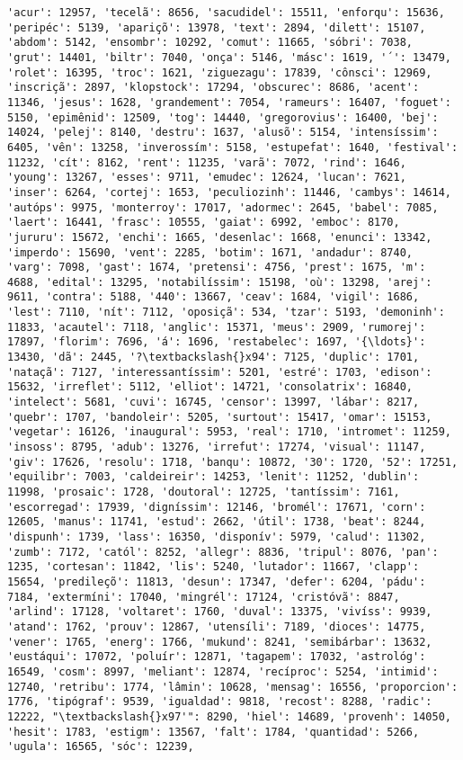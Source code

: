 \documentclass[11pt]{article}
\begin{document}
\begin{Verbatim}[commandchars=\\\{\}]
'acur': 12957, 'tecelã': 8656, 'sacudidel': 15511, 'enforqu': 15636, 'peripéc': 5139, 'apariçõ': 13978, 'text': 2894, 'dilett': 15107, 'abdom': 5142, 'ensombr': 10292, 'comut': 11665, 'sóbri': 7038, 'grut': 14401, 'biltr': 7040, 'onça': 5146, 'másc': 1619, '´': 13479, 'rolet': 16395, 'troc': 1621, 'ziguezagu': 17839, 'cônsci': 12969, 'inscriçã': 2897, 'klopstock': 17294, 'obscurec': 8686, 'acent': 11346, 'jesus': 1628, 'grandement': 7054, 'rameurs': 16407, 'foguet': 5150, 'epimênid': 12509, 'tog': 14440, 'gregorovius': 16400, 'bej': 14024, 'pelej': 8140, 'destru': 1637, 'alusõ': 5154, 'intensíssim': 6405, 'vên': 13258, 'inverossím': 5158, 'estupefat': 1640, 'festival': 11232, 'cít': 8162, 'rent': 11235, 'varã': 7072, 'rind': 1646, 'young': 13267, 'esses': 9711, 'emudec': 12624, 'lucan': 7621, 'inser': 6264, 'cortej': 1653, 'peculiozinh': 11446, 'cambys': 14614, 'autóps': 9975, 'monterroy': 17017, 'adormec': 2645, 'babel': 7085, 'laert': 16441, 'frasc': 10555, 'gaiat': 6992, 'emboc': 8170, 'jururu': 15672, 'enchi': 1665, 'desenlac': 1668, 'enunci': 13342, 'imperdo': 15690, 'vent': 2285, 'botim': 1671, 'andadur': 8740, 'varg': 7098, 'gast': 1674, 'pretensi': 4756, 'prest': 1675, 'm': 4688, 'edital': 13295, 'notabilíssim': 15198, 'où': 13298, 'arej': 9611, 'contra': 5188, '440': 13667, 'ceav': 1684, 'vigil': 1686, 'lest': 7110, 'nít': 7112, 'oposiçã': 534, 'tzar': 5193, 'demoninh': 11833, 'acautel': 7118, 'anglic': 15371, 'meus': 2909, 'rumorej': 17897, 'florim': 7696, 'á': 1696, 'restabelec': 1697, '{\ldots}': 13430, 'dã': 2445, '?\textbackslash{}x94': 7125, 'duplic': 1701, 'nataçã': 7127, 'interessantíssim': 5201, 'estré': 1703, 'edison': 15632, 'irreflet': 5112, 'elliot': 14721, 'consolatrix': 16840, 'intelect': 5681, 'cuvi': 16745, 'censor': 13997, 'lábar': 8217, 'quebr': 1707, 'bandoleir': 5205, 'surtout': 15417, 'omar': 15153, 'vegetar': 16126, 'inaugural': 5953, 'real': 1710, 'intromet': 11259, 'insoss': 8795, 'adub': 13276, 'irrefut': 17274, 'visual': 11147, 'giv': 17626, 'resolu': 1718, 'banqu': 10872, '30': 1720, '52': 17251, 'equilibr': 7003, 'caldeireir': 14253, 'lenit': 11252, 'dublin': 11998, 'prosaic': 1728, 'doutoral': 12725, 'tantíssim': 7161, 'escorregad': 17939, 'digníssim': 12146, 'bromél': 17671, 'corn': 12605, 'manus': 11741, 'estud': 2662, 'útil': 1738, 'beat': 8244, 'dispunh': 1739, 'lass': 16350, 'disponív': 5979, 'calud': 11302, 'zumb': 7172, 'catól': 8252, 'allegr': 8836, 'tripul': 8076, 'pan': 1235, 'cortesan': 11842, 'lis': 5240, 'lutador': 11667, 'clapp': 15654, 'predileçõ': 11813, 'desun': 17347, 'defer': 6204, 'pádu': 7184, 'extermíni': 17040, 'mingrél': 17124, 'cristóvã': 8847, 'arlind': 17128, 'voltaret': 1760, 'duval': 13375, 'vivíss': 9939, 'atand': 1762, 'prouv': 12867, 'utensíli': 7189, 'dioces': 14775, 'vener': 1765, 'energ': 1766, 'mukund': 8241, 'semibárbar': 13632, 'eustáqui': 17072, 'poluír': 12871, 'tagapem': 17032, 'astrológ': 16549, 'cosm': 8997, 'meliant': 12874, 'recíproc': 5254, 'intimid': 12740, 'retribu': 1774, 'lâmin': 10628, 'mensag': 16556, 'proporcion': 1776, 'tipógraf': 9539, 'igualdad': 9818, 'recost': 8288, 'radic': 12222, "\textbackslash{}x97'": 8290, 'hiel': 14689, 'provenh': 14050, 'hesit': 1783, 'estigm': 13567, 'falt': 1784, 'quantidad': 5266, 'ugula': 16565, 'sóc': 12239, 
\end{Verbatim}
\end{document}
